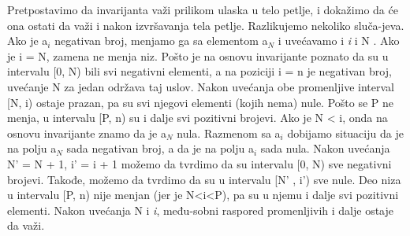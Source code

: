 \documentclass{article}
\begin{document}
Pretpostavimo \hspace*{0.8cm}da invarijanta važi prilikom ulaska u telo petlje, i dokažimo da će ona \hspace*{0.8cm}ostati da 	važi i nakon izvršavanja tela petlje. Razlikujemo nekoliko sluča-\hspace*{0.8cm}jeva. Ako je a$_i$ negativan broj, menjamo ga sa elementom a$_N$ i uvećavamo \hspace*{0.8cm}i \textit{i} i N . Ako je i = N, 	   zamena ne menja niz. Pošto je na osnovu invarijante \hspace*{0.8cm}poznato da su u intervalu [0, N) bili 	   svi negativni elementi, a na poziciji \newline \hspace*{0.8cm}i = n je negativan broj, uvećanje N za jedan održava taj 	   uslov. Nakon \hspace*{0.8cm}uvećanja obe promenljive interval [N, i) ostaje prazan, pa su svi njegovi \hspace*{0.8cm}elementi (kojih nema) nule. Pošto se P ne menja, u intervalu [P, n) su \hspace*{0.8cm}i dalje svi pozitivni 	   brojevi. Ako je N < i, onda na osnovu invarijante \hspace*{0.8cm}znamo da je a$_N$ nula. Razmenom sa a$_i$ dobijamo situaciju da je na polju \newline \hspace*{0.8cm}a$_N$ sada negativan broj, a da je na polju a$_i$ sada nula. Nakon uvećanja \newline \hspace*{0.8cm}N' = N + 1, i' = i + 1 možemo da tvrdimo da su intervalu [0, N) sve \hspace*{0.8cm}negativni brojevi. Takođe, možemo da tvrdimo da su u intervalu \newline \hspace*{0.8cm}[N' , i') sve nule. Deo niza 	   u  intervalu [P, n) nije menjan (jer je N<i<P), \hspace*{0.8cm}pa su u njemu i dalje svi pozitivni elementi. Nakon uvećanja N i \textit{i}, među-\hspace*{0.8cm}sobni raspored promenljivih i dalje ostaje da važi.
\end{document}
